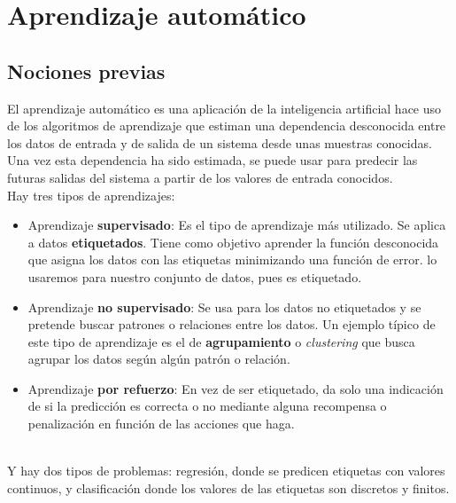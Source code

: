 

\chapter{Aprendizaje automático}\label{ch:machine-learning}
\section{Nociones previas}
El aprendizaje automático es una aplicación de la inteligencia artificial hace uso de los algoritmos de aprendizaje que estiman una dependencia desconocida entre los datos de entrada y de salida de un sistema desde unas muestras conocidas. Una vez esta dependencia ha sido estimada, se puede usar para predecir las futuras salidas del sistema a partir de los valores de entrada conocidos.\\
Hay tres tipos de aprendizajes:
\begin{itemize}
  \item Aprendizaje \textbf{supervisado}: Es el tipo de aprendizaje más utilizado. Se aplica a datos \textbf{etiquetados}. Tiene como objetivo aprender la función desconocida que asigna los datos con las etiquetas minimizando una función de error. lo usaremos para nuestro conjunto de datos, pues es etiquetado.
  \item Aprendizaje \textbf{no supervisado}: Se usa para los datos no etiquetados y se pretende buscar patrones o relaciones entre los datos. Un ejemplo típico de este tipo de aprendizaje es el de \textbf{agrupamiento} o \textit{clustering} que busca agrupar los datos según algún patrón o relación.
  \item Aprendizaje \textbf{por refuerzo}: En vez de ser etiquetado, da solo una indicación de si la predicción es correcta o no mediante alguna recompensa o penalización en función de las acciones que haga.
\end{itemize}
\cite{jordan2015machine}\\
Y hay dos tipos de problemas: regresión, donde se predicen etiquetas con valores continuos, y clasificación donde los valores de las etiquetas son discretos y finitos.
